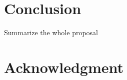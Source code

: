 \documentclass[journal,onecolumn]{IEEEtran}
\begin{document}




\section{Conclusion}
Summarize the whole proposal






%



\section*{Acknowledgment}
\end{document}
